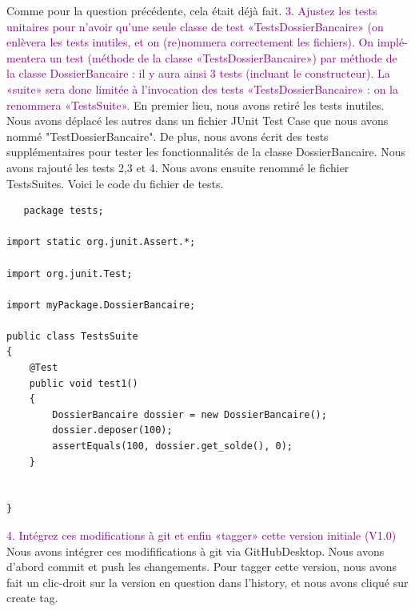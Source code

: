 \documentclass{article}
\begin{document}
\newline
Comme pour la question précédente, cela était déjà fait.
\bigskip
\newline
\textcolor{Purple}{3. Ajustez les tests unitaires pour n’avoir qu’une seule classe de test «TestsDossierBancaire»
(on enlèvera les tests inutiles, et on (re)nommera correctement les fichiers). On implé-
mentera un test (méthode de la classe «TestsDossierBancaire») par méthode de la classe
DossierBancaire : il y aura ainsi 3 tests (incluant le constructeur). La «suite» sera donc
limitée à l’invocation des tests «TestsDossierBancaire» : on la renommera «TestsSuite».}
\newline
En premier lieu, nous avons retiré les tests inutiles. Nous avons déplacé les autres dans un fichier JUnit Test Case que nous avons nommé "TestDossierBancaire". De plus, nous avons écrit des tests supplémentaires pour tester les fonctionnalités de la classe DossierBancaire. Nous avons rajouté les tests 2,3 et 4. Nous avons ensuite renommé le fichier TestsSuites.
Voici le code du fichier de tests.

\begin{lstlisting}
   package tests;

import static org.junit.Assert.*;

import org.junit.Test;

import myPackage.DossierBancaire;

public class TestsSuite
{
	@Test  
	public void test1() 
	{
		DossierBancaire dossier = new DossierBancaire();
		dossier.deposer(100);
		assertEquals(100, dossier.get_solde(), 0);
	}
	
	
}
\end{lstlisting}
\textcolor{Purple}{4. Intégrez ces modifications à git et enfin «tagger» cette version initiale (V1.0)}
Nous avons intégrer ces modififications à git via GitHubDesktop. Nous avons d'abord commit et push les changements. Pour tagger cette version, nous avons fait un clic-droit sur la version en question dans l'history, et nous avons cliqué sur create tag.
\end{document}
